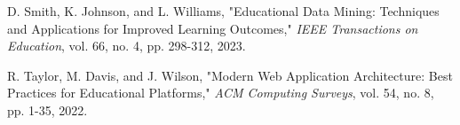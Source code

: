 \documentclass[conference]{IEEEtran}
\begin{document}
\begin{thebibliography}{00}
 D. Smith, K. Johnson, and L. Williams, "Educational Data Mining: Techniques and Applications for Improved Learning Outcomes," \textit{IEEE Transactions on Education}, vol. 66, no. 4, pp. 298-312, 2023.

 R. Taylor, M. Davis, and J. Wilson, "Modern Web Application Architecture: Best Practices for Educational Platforms," \textit{ACM Computing Surveys}, vol. 54, no. 8, pp. 1-35, 2022.

\end{thebibliography}
\end{document}

